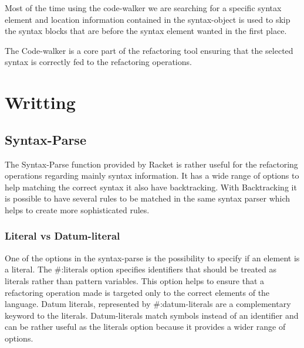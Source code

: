 Most of the time using the code-walker we are searching for a specific syntax element
and location information contained in the syntax-object  is used to skip the syntax
 blocks that are before the syntax element wanted in the first place.

The Code-walker is a core part of the refactoring tool ensuring that the selected
syntax is correctly fed to the refactoring operations. %



\section{Writting}
\subsection{Syntax-Parse}

The Syntax-Parse function provided by Racket is rather useful for the refactoring
operations regarding mainly syntax information.
It has a wide range of options to help matching the correct syntax it also have  %
backtracking.
With Backtracking it is possible to have several rules to be matched
in the same syntax parser which helps to create more sophisticated rules.

\subsubsection{Literal vs Datum-literal}
One of the options in the syntax-parse is the possibility to specify if an element
is a literal.
The \#:literals option specifies identifiers that should be treated as literals
rather than pattern variables.
This option helps to ensure that a refactoring operation made is targeted only
to the correct elements of the language.
Datum literals, represented by \#:datum-literals are a complementary keyword to the
literals.
Datum-literals match symbols instead of an identifier and can be rather useful as
the literals option because it provides a wider range of options.

